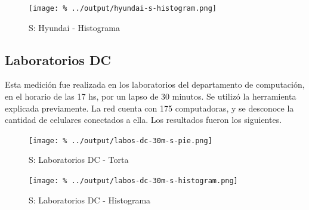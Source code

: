 \documentclass[final,inline,a4paper,narroweqnarray]{ieee}
\begin{document}
    \begin{figure}[h]\begin{center}
      \texttt{[image: \%
      ../output/hyundai-s-histogram.png]}
      \caption{S: Hyundai - Histograma}
      \label{hyundai-s-histogram}
    \end{center}\end{figure}

  \subsection{Laboratorios DC}

    Esta medición fue realizada en los laboratorios del departamento de
    computación, en el horario de las 17 hs, por un lapso de 30 minutos.
    Se utilizó la herramienta explicada previamente. La red cuenta con 175
    computadoras, y se desconoce la cantidad de celulares conectados a ella.
    Los resultados fueron los siguientes.
   
    \begin{figure}[ht]\begin{center}
      \texttt{[image: \%
      ../output/labos-dc-30m-s-pie.png]}
      \vspace{-3em}
      \caption{S: Laboratorios DC - Torta}
      \label{labos-dc-30m-s-pie}
    \end{center}\end{figure}

    \begin{figure}[ht]\begin{center}
      \texttt{[image: \%
      ../output/labos-dc-30m-s-histogram.png]}
      \caption{S: Laboratorios DC - Histograma}
      \label{labos-dc-30m-s-histogram}
    \end{center}\end{figure}
\end{document}
